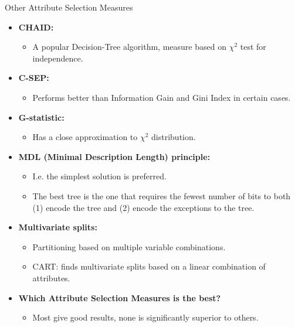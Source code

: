 \begin{frame}{Other Attribute Selection Measures}
	\begin{itemize}
		\item \textbf{CHAID:}
		      \begin{itemize}
			      \item A popular Decision-Tree algorithm, measure based on $\chi^2$ test for independence.
		      \end{itemize}
		\item \textbf{C-SEP:}
		      \begin{itemize}
			      \item Performs better than Information Gain and Gini Index in certain cases.
		      \end{itemize}
		\item \textbf{G-statistic:}
		      \begin{itemize}
			      \item Has a close approximation to $\chi^2$ distribution.
		      \end{itemize}
		\item \textbf{MDL (Minimal Description Length) principle:}
		      \begin{itemize}
			      \item I.e. the simplest solution is preferred.
			      \item The best tree is the one that requires the fewest number of bits to both (1) encode the tree and (2) encode the exceptions to the tree.
		      \end{itemize}
		\item \textbf{Multivariate splits:}
		      \begin{itemize}
			      \item Partitioning based on multiple variable combinations.
			      \item CART: finds multivariate splits based on a linear combination of attributes.
		      \end{itemize}
		\item \textbf{Which Attribute Selection Measures is the best?}
		      \begin{itemize}
			      \item Most give good results, none is significantly superior to others.
		      \end{itemize}
	\end{itemize}
\end{frame}

